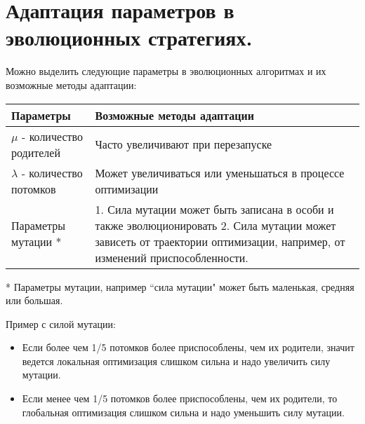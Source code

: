 \section{Адаптация параметров в эволюционных стратегиях.}

 Можно выделить следующие параметры в эволюционных алгоритмах и их возможные методы адаптации:

\begin{center}
    \begin{tabular}{ |  l | p{5cm} |}
    \hline
    Параметры &  Возможные методы адаптации \\ \hline
    $\mu$ - количество родителей  &  Часто увеличивают при перезапуске 
    \\ \hline
    $\lambda$ - количество потомков &   Может увеличиваться или уменьшаться в процессе оптимизации \\ \hline
    Параметры мутации * &  1.	Сила мутации может быть записана в особи и также эволюционировать
    2.	Сила мутации может зависеть от траектории оптимизации, например, от изменений приспособленности. \\
    \hline
    \end{tabular}
\end{center}

* Параметры мутации, например “сила мутации" 
 может быть маленькая, средняя или большая.

Пример с силой мутации: 

\begin{itemize}
      \item Если более чем 1/5 потомков более приспособлены, чем их родители, значит ведется локальная оптимизация слишком сильна и надо увеличить силу мутации. 
      \item Если менее чем 1/5 потомков более приспособлены, чем их родители, то глобальная оптимизация слишком сильна и надо уменьшить силу мутации.
   \end{itemize}
